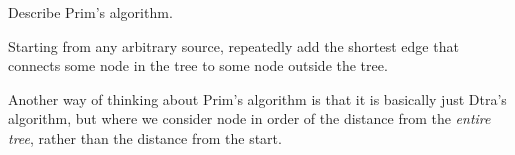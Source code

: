 \question Describe Prim's algorithm.

\begin{solution}[0.5in]
Starting from any arbitrary source, repeatedly add the shortest edge that
connects some node in the tree to some node outside the tree.

Another way of thinking about Prim's algorithm is that it is basically just
Dtra's algorithm, but where we consider node in order of the distance from the
\emph{entire tree}, rather than the distance from the start.
\end{solution}

